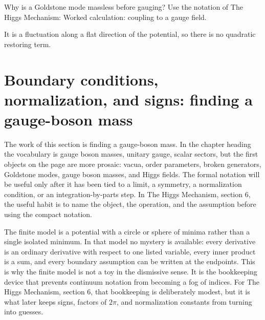 \begin{exercise}
Why is a Goldstone mode massless before gauging?  Use the notation of The Higgs Mechanism: Worked calculation: coupling to a gauge field.
\begin{answer}
It is a fluctuation along a flat direction of the potential, so there is no quadratic restoring term.
\end{answer}
\end{exercise}



\section{Boundary conditions, normalization, and signs: finding a gauge-boson mass}













The work of this section is finding a gauge-boson mass.  In the chapter heading the vocabulary is gauge boson masses, unitary gauge, scalar sectors, but the first objects on the page are more prosaic: vacua, order parameters, broken generators, Goldstone modes, gauge boson masses, and Higgs fields.  The formal notation will be useful only after it has been tied to a limit, a symmetry, a normalization condition, or an integration-by-parts step.  In The Higgs Mechanism, section 6, the useful habit is to name the object, the operation, and the assumption before using the compact notation.

The finite model is a potential with a circle or sphere of minima rather than a single isolated minimum.  In that model no mystery is available: every derivative is an ordinary derivative with respect to one listed variable, every inner product is a sum, and every boundary assumption can be written at the endpoints.  This is why the finite model is not a toy in the dismissive sense.  It is the bookkeeping device that prevents continuum notation from becoming a fog of indices.  For The Higgs Mechanism, section 6, that bookkeeping is deliberately modest, but it is what later keeps signs, factors of \(2\pi\), and normalization constants from turning into guesses.

